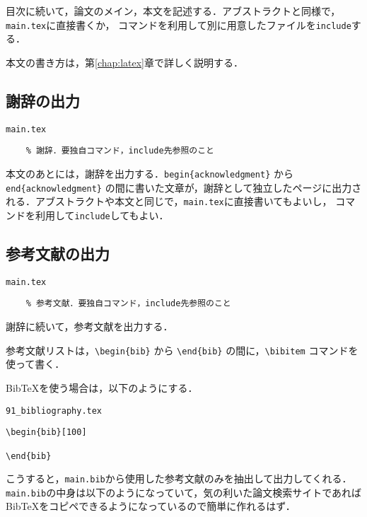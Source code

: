 目次に続いて，論文のメイン，本文を記述する．アブストラクトと同様で，{\tt main.tex}に直接書くか，\verb|| コマンドを利用して別に用意したファイルを{\tt include}する．

本文の書き方は，第\ref{chap:latex}章で詳しく説明する．


\subsection{謝辞の出力}

\begin{itembox}[l]{{\tt main.tex}}
\begin{verbatim}
	% 謝辞．要独自コマンド，include先参照のこと
\end{verbatim}
\end{itembox}

本文のあとには，謝辞を出力する．\verb|begin{acknowledgment}| から \verb|end{acknowledgment}| の間に書いた文章が，謝辞として独立したページに出力される．アブストラクトや本文と同じで，{\tt main.tex}に直接書いてもよいし，\verb|| コマンドを利用して{\tt include}してもよい．


\subsection{参考文献の出力}

\begin{itembox}[l]{{\tt main.tex}}
\begin{verbatim}
	% 参考文献．要独自コマンド，include先参照のこと
\end{verbatim}
\end{itembox}

謝辞に続いて，参考文献を出力する．

参考文献リストは，\verb|\begin{bib}| から \verb|\end{bib}| の間に，\verb|\bibitem| コマンドを使って書く．

BibTeXを使う場合は，以下のようにする．

\begin{itembox}[l]{{\tt 91\_bibliography.tex}}
\begin{verbatim}
\begin{bib}[100]

\end{bib}
\end{verbatim}
\end{itembox}

こうすると，\verb|main.bib|から使用した参考文献のみを抽出して出力してくれる．\verb|main.bib|の中身は以下のようになっていて，気の利いた論文検索サイトであればBibTeXをコピペできるようになっているので簡単に作れるはず．


